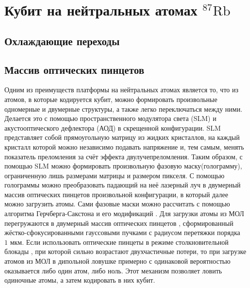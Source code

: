 \section{Кубит на нейтральных атомах $^{87}\text{Rb}$}
\label{sec:chapter_2}

\subsection{Охлаждающие переходы}


\subsection{Массив оптических пинцетов}

Одним из преимуществ платформы на нейтральных атомах является то, что из атомов, в которые кодируется кубит, можно формировать произвольные одномерные и двумерные структуры, а также легко переключаться между ними. Делается это с помощью пространственного модулятора света (SLM) и акустооптического дефлектора (АОД) в скрещенной конфигурации. SLM представляет собой прямоугольную матрицу из жидких кристаллов, на каждый кристалл которой можно независимо подавать напряжение и, тем самым, менять показатель преломления за счёт эффекта двулучепреломления. Таким образом, с помощью SLM можно формировать произвольную фазовую маску(голограмму), ограниченную лишь размерами матрицы и размером пикселя. С помощью голограммы можно преобразовать падающий на неё лазерный луч в двумерный массив оптических пинцетов произвольной конфигурации, в который далее можно загрузить атомы. Сами фазовые маски можно рассчитать с помощью алгоритма Герчберга-Сакстона \cite{Gerchberg1972APA} и его модификаций \cite{robust_masks,Zupancic:16}. Для загрузки атомы из МОЛ перегружаются в двумерный массив оптических пинцетов \cite{Ashkin:99}, сформированный жёстко-сфокусированными гауссовыми пучками с радиусом перетяжки порядка $1 \text{ мкм}$. Если использовать оптические пинцеты в режиме столкновительной блокады \cite{Schlosser_Grangier,Kuppens_Wieman}, при которой сильно возрастают двухчастичные потери, то при загрузке атомов из МОЛ в дипольной ловушке примерно с одинаковой вероятностью оказывается либо один атом, либо ноль. Этот механизм позволяет ловить одиночные атомы, а затем кодировать в них кубит. 

